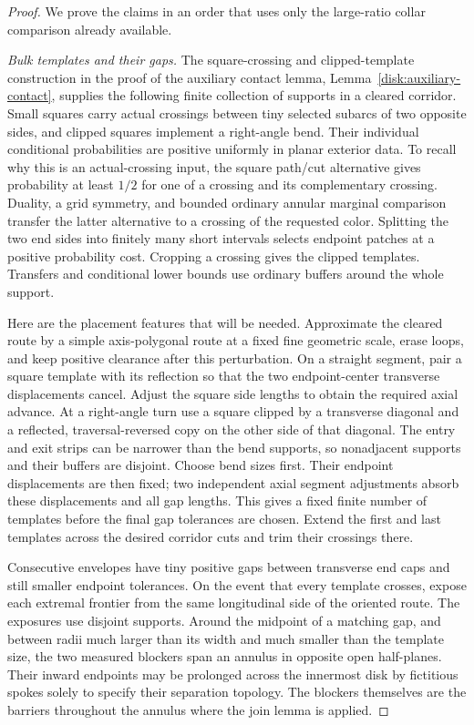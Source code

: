 \begin{proof}
We prove the claims in an order that uses only the large-ratio collar
comparison already available.

\emph{Bulk templates and their gaps.}
The square-crossing and clipped-template construction in the proof of
the auxiliary contact lemma, Lemma~\ref{disk:auxiliary-contact}, supplies
the following finite collection of supports in a cleared corridor.
Small squares carry actual crossings between tiny selected subarcs of
two opposite sides, and clipped squares implement a right-angle bend.
Their individual conditional probabilities are positive uniformly in
planar exterior data. To recall why this is an actual-crossing input,
the square path/cut alternative gives probability at least $1/2$ for
one of a crossing and its complementary crossing. Duality, a grid
symmetry, and bounded ordinary annular marginal comparison transfer
the latter alternative to a crossing of the requested color. Splitting
the two end sides into finitely many short intervals selects endpoint
patches at a positive probability cost. Cropping a crossing gives the
clipped templates. Transfers and conditional lower bounds use ordinary
buffers around the whole support.

Here are the placement features that will be needed. Approximate the
cleared route by a simple axis-polygonal route at a fixed fine geometric
scale, erase loops, and keep positive clearance after this perturbation.
On a straight segment, pair a square template with its reflection so
that the two endpoint-center transverse displacements cancel. Adjust
the square side lengths to obtain the required axial advance. At a
right-angle turn use a square clipped by a transverse diagonal and a
reflected, traversal-reversed copy on the other side of that diagonal.
The entry and exit strips can be narrower than the bend supports, so
nonadjacent supports and their buffers are disjoint. Choose bend sizes
first. Their endpoint displacements are then fixed; two independent
axial segment adjustments absorb these displacements and all gap
lengths. This gives a fixed finite number of templates before the
final gap tolerances are chosen. Extend the first and last templates
across the desired corridor cuts and trim their crossings there.

Consecutive envelopes have tiny positive gaps between transverse end
caps and still smaller endpoint tolerances. On the event that every
template crosses, expose each extremal frontier from the same
longitudinal side of the oriented route. The exposures use disjoint
supports. Around the midpoint of a matching gap, and between radii
much larger than its width and much smaller than the template size,
the two measured blockers span an annulus in opposite open
half-planes. Their inward endpoints may be prolonged across the
innermost disk by fictitious spokes solely to specify their separation
topology. The blockers themselves are the barriers throughout the
annulus where the join lemma is applied.


\end{proof}
